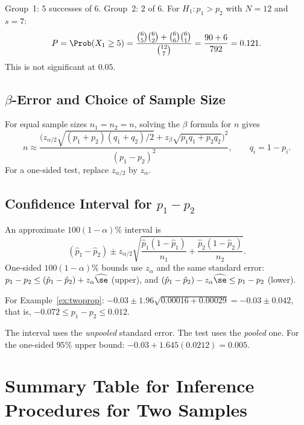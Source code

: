 \begin{example}
Group~1: $5$ successes of $6$. Group~2: $2$ of $6$. For $H_1:p_1>p_2$ with $N=12$ and $s=7$:
\[ P=\Prob(X_1\ge5)=\frac{\binom65\binom62+\binom66\binom61}{\binom{12}7}=\frac{90+6}{792}=0.121. \]
This is not significant at $0.05$.
\end{example}

\subsection{$\beta$-Error and Choice of Sample Size}

For equal sample sizes $n_1=n_2=n$, solving the $\beta$ formula for $n$ gives
\[ n\approx\frac{\Big(z_{\alpha/2}\sqrt{(p_1+p_2)(q_1+q_2)/2}+z_\beta\sqrt{p_1q_1+p_2q_2}\Big)^2}{(p_1-p_2)^2},\qquad q_i=1-p_i. \]
For a one-sided test, replace $z_{\alpha/2}$ by $z_\alpha$.

\subsection{Confidence Interval for $p_1-p_2$}

\begin{theorem}\label{thm:twoprop-ci}
An approximate $100(1-\alpha)\%$ interval is
\[ (\hat{p}_1-\hat{p}_2)\pm z_{\alpha/2}\sqrt{\frac{\hat{p}_1(1-\hat{p}_1)}{n_1}+\frac{\hat{p}_2(1-\hat{p}_2)}{n_2}}. \]
One-sided $100(1-\alpha)\%$ bounds use $z_\alpha$ and the same standard error: $p_1-p_2\le(\hat{p}_1-\hat{p}_2)+z_\alpha\widehat{\se}$ (upper), and $(\hat{p}_1-\hat{p}_2)-z_\alpha\widehat{\se}\le p_1-p_2$ (lower).
\end{theorem}

\begin{example}
For Example~\ref{ex:twoprop}: $-0.03\pm1.96\sqrt{0.00016+0.00029}=-0.03\pm0.042$, that is, $-0.072\le p_1-p_2\le0.012$.

The interval uses the \emph{unpooled} standard error. The test uses the \emph{pooled} one. For the one-sided $95\%$ upper bound: $-0.03+1.645(0.0212)=0.005$.
\end{example}

\section{Summary Table for Inference Procedures for Two Samples}

